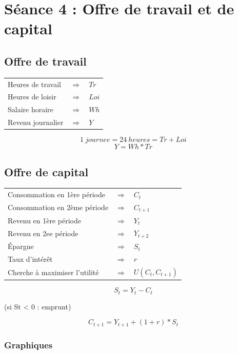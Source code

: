 \section{Séance 4 : Offre de travail et de capital}


\subsection{Offre de travail}



\begin{tabular}{lll}
	Heures de travail & $\Rightarrow$ & $Tr$\\
	Heures de loisir  & $\Rightarrow$ & $Loi$\\
	Salaire horaire   & $\Rightarrow$ & $Wh$\\
	Revenu journalier & $\Rightarrow$ & $Y$\\
\end{tabular}
$$1\ journee = 24\ heures = Tr + Loi$$
$$Y = Wh * Tr$$



\subsection{Offre de capital}



\begin{tabular}{lll}
	Consommation en 1ère période  & $\Rightarrow$ & $C_t$\\
	Consommation en 2ème période  & $\Rightarrow$ & $C_{t+1}$\\
	Revenu en 1ère période        & $\Rightarrow$ & $Y_t$\\
	Revenu en 2ee période         & $\Rightarrow$ & $Y_{t+2}$\\
	Épargne                       & $\Rightarrow$ & $S_t$\\
	Taux d'intérêt                & $\Rightarrow$ & $r$\\
	Cherche à maximiser l'utilité & $\Rightarrow$ & $U(C_t,C_{t+1})$
\end{tabular}
$$S_t = Y_t - C_t$$
\begin{flushright}
	(si St < 0 : emprunt)
\end{flushright}
$$C_{t+1} = Y_{t+1} + ( 1 + r ) * S_t $$



\subsubsection{Graphiques}



